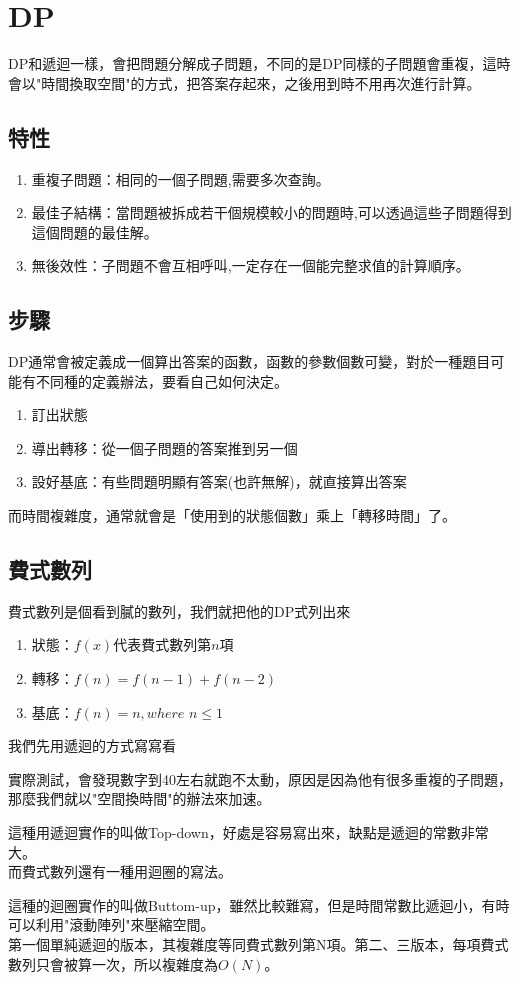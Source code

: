 \section{DP}
DP和遞迴一樣，會把問題分解成子問題，不同的是DP同樣的子問題會重複，這時會以"時間換取空間"的方式，把答案存起來，之後用到時不用再次進行計算。
\subsection{特性}
\begin{enumerate}
\item 重複子問題：相同的一個子問題,需要多次查詢。
\item 最佳子結構：當問題被拆成若干個規模較小的問題時,可以透過這些子問題得到這個問題的最佳解。
\item 無後效性：子問題不會互相呼叫,一定存在一個能完整求值的計算順序。
\end{enumerate}
\subsection{步驟}
DP通常會被定義成一個算出答案的函數，函數的參數個數可變，對於一種題目可能有不同種的定義辦法，要看自己如何決定。
\begin{enumerate}
\item 訂出狀態
\item 導出轉移：從一個子問題的答案推到另一個
\item 設好基底：有些問題明顯有答案(也許無解)，就直接算出答案
\end{enumerate}
而時間複雜度，通常就會是「使用到的狀態個數」乘上「轉移時間」了。
\subsection{費式數列}
費式數列是個看到膩的數列，我們就把他的DP式列出來
\begin{enumerate}
\item 狀態：$f(x)$代表費式數列第$n$項
\item 轉移：$f(n)=f(n-1)+f(n-2)$
\item 基底：$f(n)=n,where$ $n\leq 1$
\end{enumerate}
我們先用遞迴的方式寫寫看

實際測試，會發現數字到40左右就跑不太動，原因是因為他有很多重複的子問題，那麼我們就以"空間換時間"的辦法來加速。

這種用遞迴實作的叫做Top-down，好處是容易寫出來，缺點是遞迴的常數非常大。\\
而費式數列還有一種用迴圈的寫法。

這種的迴圈實作的叫做Buttom-up，雖然比較難寫，但是時間常數比遞迴小，有時可以利用"滾動陣列"來壓縮空間。\\
第一個單純遞迴的版本，其複雜度等同費式數列第N項。第二、三版本，每項費式數列只會被算一次，所以複雜度為$O(N)$。
